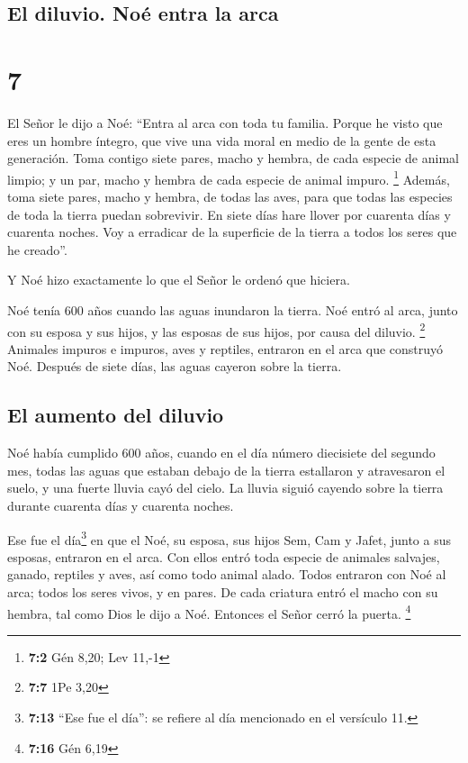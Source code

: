 \hypertarget{el-diluvio.-nouxe9-entra-la-arca}{%
\subsection{El diluvio. Noé entra la
arca}\label{el-diluvio.-nouxe9-entra-la-arca}}

\hypertarget{section-6}{%
\section{7}\label{section-6}}

 El Señor le dijo a Noé: ``Entra al arca con toda tu
familia. Porque he visto que eres un hombre íntegro, que vive una vida
moral en medio de la gente de esta generación.  Toma
contigo siete pares, macho y hembra, de cada especie de animal limpio; y
un par, macho y hembra de cada especie de animal impuro. \footnote{\textbf{7:2}
  Gén 8,20; Lev 11,-1}  Además, toma siete pares, macho y
hembra, de todas las aves, para que todas las especies de toda la tierra
puedan sobrevivir.  En siete días hare llover por cuarenta
días y cuarenta noches. Voy a erradicar de la superficie de la tierra a
todos los seres que he creado''.

 Y Noé hizo exactamente lo que el Señor le ordenó que
hiciera.

 Noé tenía 600 años cuando las aguas inundaron la tierra.
 Noé entró al arca, junto con su esposa y sus hijos, y las
esposas de sus hijos, por causa del diluvio. \footnote{\textbf{7:7} 1Pe
  3,20}  Animales impuros e impuros, aves y reptiles,
 entraron en el arca que construyó Noé. 
Después de siete días, las aguas cayeron sobre la tierra.

\hypertarget{el-aumento-del-diluvio}{%
\subsection{El aumento del diluvio}\label{el-aumento-del-diluvio}}

 Noé había cumplido 600 años, cuando en el día número
diecisiete del segundo mes, todas las aguas que estaban debajo de la
tierra estallaron y atravesaron el suelo, y una fuerte lluvia cayó del
cielo.  La lluvia siguió cayendo sobre la tierra durante
cuarenta días y cuarenta noches.

 Ese fue el día\footnote{\textbf{7:13} ``Ese fue el
  día'': se refiere al día mencionado en el versículo 11.} en que el
Noé, su esposa, sus hijos Sem, Cam y Jafet, junto a sus esposas,
entraron en el arca.  Con ellos entró toda especie de
animales salvajes, ganado, reptiles y aves, así como todo animal alado.
 Todos entraron con Noé al arca; todos los seres vivos, y
en pares.  De cada criatura entró el macho con su hembra,
tal como Dios le dijo a Noé. Entonces el Señor cerró la puerta.
\footnote{\textbf{7:16} Gén 6,19}

